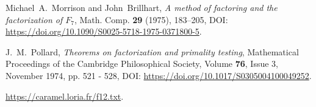 \documentclass[a4paper, 11pt, pdftex]{report}
\theoremstyle{plain}
\theoremstyle{definition}
\begin{document}
\begin{thebibliography}{99}
 Michael~A.~Morrison and John~Brillhart, \emph{A method of factoring
and the factorization of $F_7$}, Math. Comp. \textbf{29} (1975), 183--205,
DOI: \url{https://doi.org/10.1090/S0025-5718-1975-0371800-5}.

 J.~M.~Pollard, \emph{Theorems on factorization and  primality testing},
Mathematical Proceedings of the Cambridge Philosophical Society, Volume \textbf{76}, Issue 3,
November 1974, pp. 521 - 528, DOI: \url{https://doi.org/10.1017/S0305004100049252}.

 \url{https://caramel.loria.fr/f12.txt}.

\end{thebibliography}
\end{document}

